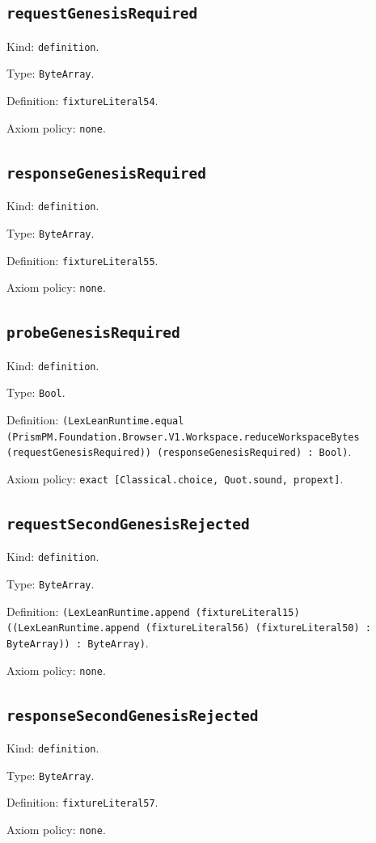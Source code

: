 \documentclass[11pt]{article}
\begin{document}
\subsection*{\texttt{requestGenesisRequired}}
\noindent Kind: \texttt{definition}.\par
\noindent Type: \texttt{ByteArray}.\par
\noindent Definition: \texttt{fixtureLiteral54}.\par
\noindent Axiom policy: \texttt{none}.\par
\subsection*{\texttt{responseGenesisRequired}}
\noindent Kind: \texttt{definition}.\par
\noindent Type: \texttt{ByteArray}.\par
\noindent Definition: \texttt{fixtureLiteral55}.\par
\noindent Axiom policy: \texttt{none}.\par
\subsection*{\texttt{probeGenesisRequired}}
\noindent Kind: \texttt{definition}.\par
\noindent Type: \texttt{Bool}.\par
\noindent Definition: \texttt{(LexLeanRuntime.equal (PrismPM.Foundation.Browser.V1.Workspace.reduceWorkspaceBytes (requestGenesisRequired)) (responseGenesisRequired) : Bool)}.\par
\noindent Axiom policy: \texttt{exact [Classical.choice, Quot.sound, propext]}.\par
\subsection*{\texttt{requestSecondGenesisRejected}}
\noindent Kind: \texttt{definition}.\par
\noindent Type: \texttt{ByteArray}.\par
\noindent Definition: \texttt{(LexLeanRuntime.append (fixtureLiteral15) ((LexLeanRuntime.append (fixtureLiteral56) (fixtureLiteral50) : ByteArray)) : ByteArray)}.\par
\noindent Axiom policy: \texttt{none}.\par
\subsection*{\texttt{responseSecondGenesisRejected}}
\noindent Kind: \texttt{definition}.\par
\noindent Type: \texttt{ByteArray}.\par
\noindent Definition: \texttt{fixtureLiteral57}.\par
\noindent Axiom policy: \texttt{none}.\par
\end{document}

